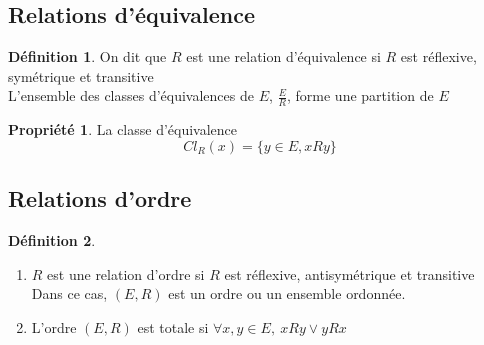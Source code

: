 \documentclass[fleqn]{article}
\theoremstyle{definition} \newtheorem*{defi}{D\'efinition}
\theoremstyle{definition} \newtheorem*{theo}{Th\'eor\`eme}
\theoremstyle{definition} \newtheorem*{coro}{Corollaire}
\theoremstyle{remark} \newtheorem*{rqs}{Remarques}
\theoremstyle{definition} \newtheorem*{prop}{Propri\'et\'e}
\begin{document}
\subsection{Relations d'\'equivalence}
\begin{defi}
	On dit que \(R\) est une relation d'\'equivalence si \(R\) est r\'eflexive, sym\'etrique et transitive \\
	L'ensemble des classes d'\'equivalences de $E$, $\frac{E}{R}$, forme une partition de $E$
\end{defi}
\begin{prop} La classe d'\'equivalence
	\[Cl_R(x) = \{y \in E ,xRy\}\]
\end{prop}

\subsection{Relations d'ordre}
\begin{defi} $ $
	\begin{enumerate}
		\item \(R\) est une relation d'ordre si \(R\) est r\'eflexive, antisym\'etrique et transitive \\
			Dans ce cas, \((E,R)\) est un ordre ou un ensemble ordonn\'ee.
		\item L'ordre \((E,R)\) est totale si \(\forall x,y \in E,\ xRy \lor yRx\)
	\end{enumerate}
\end{defi}
\end{document}
